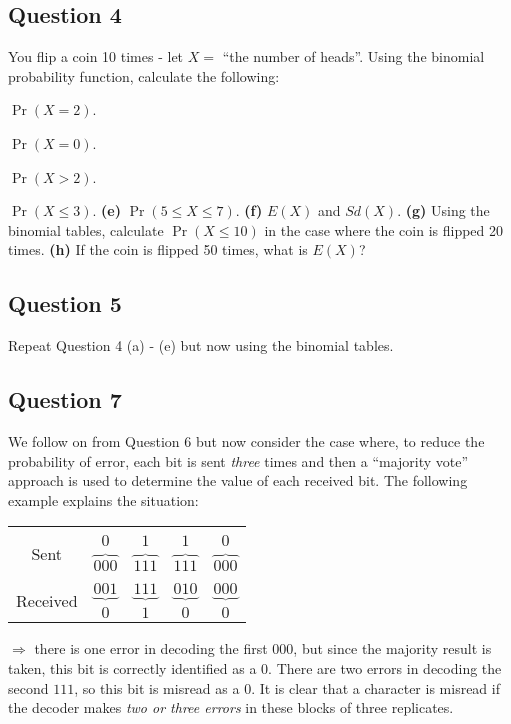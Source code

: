 
\subsection*{Question 4}

You flip a coin 10 times - let $X =$ ``the number of heads''. Using the binomial probability function, calculate the following:\\[-0.2cm]

\item  $\Pr(X = 2)$. 
 \item  $\Pr(X = 0)$. 
 \item   $\Pr(X > 2)$. 
 \item  $\Pr(X \le 3)$. 
 {\bf(e)} $\Pr(5 \le X \le 7)$.  
 {\bf(f)} $E(X)$ and $Sd(X)$. 
 {\bf(g)} Using the binomial tables, calculate $\Pr(X \le10)$ in the case where the coin is flipped 20 times. 
 {\bf(h)} If the coin is flipped 50 times, what is $E(X)$?

\subsection*{Question 5}

Repeat Question 4 (a) - (e) but now using the binomial tables.




\subsection*{Question 7}
We follow on from Question 6 but now consider the case where, to reduce the probability of error, each bit is sent \emph{three} times and then a ``majority vote'' approach is used to determine the value of each received bit. The following example explains the situation:\\[-0.5cm]
\begin{center}
\begin{tabular}{ccccc}
\hline
&&&&\\[-0.3cm]
\multirow{2}{*}{Sent} & $0$ & $1$ & $1$ & $0$ \\
& $\overbrace{000}$ & $\overbrace{111}$ & $\overbrace{111}$ & $\overbrace{000}$ \\[0.2cm]
\hline
&&&&\\[-0.3cm]
\multirow{2}{*}{Received} & $\underbrace{001}$ & $\underbrace{111}$ & $\underbrace{010}$ & $\underbrace{000}$ \\
& $0$ & $1$ & $0$ & $0$ \\[0.2cm]
\hline
\end{tabular}
\end{center}
$\Rightarrow$ there is one error in decoding the first $000$, but since the majority result is taken, this bit is correctly identified as a $0$. There are two errors in decoding the second $111$, so this bit is misread as a $0$. It is clear that a character is misread if the decoder makes \emph{two or three errors} in these blocks of three replicates.\\[-0.2cm]

